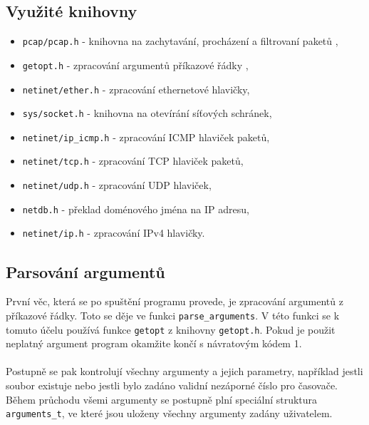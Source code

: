 \documentclass[12pt]{article}
\begin{document}
\subsection*{Využité knihovny}
\begin{itemize}
	\item \texttt{pcap/pcap.h} - knihovna na zachytavání, procházení a filtrovaní paketů \cite{Pcapman}, 
	\item \texttt{getopt.h} - zpracování argumentů příkazové řádky \cite{ARG},
	\item \texttt{netinet/ether.h} - zpracování ethernetové hlavičky, 
	\item \texttt{sys/socket.h} - knihovna na otevírání síťových schránek,
	\item \texttt{netinet/ip\_icmp.h} - zpracování ICMP hlaviček paketů,
	\item \texttt{netinet/tcp.h} - zpracování TCP hlaviček paketů,
	\item \texttt{netinet/udp.h} - zpracování UDP hlaviček,
	\item \texttt{netdb.h} - překlad doménového jména na IP adresu,
	\item \texttt{netinet/ip.h} - zpracování IPv4 hlavičky.
\end{itemize}
\subsection{Parsování argumentů}
První věc, která se po spuštění programu provede, je zpracování argumentů z příkazové řádky. Toto se děje ve funkci \texttt{parse\_arguments}. V této funkci se k tomuto účelu používá funkce 
\texttt{getopt} z knihovny \texttt{getopt.h}. Pokud je použit neplatný argument program okamžite končí s návratovým kódem 1. 
\\\\
Postupně se pak kontrolují všechny argumenty a jejich parametry, například jestli soubor existuje nebo jestli bylo zadáno validní nezáporné číslo pro časovače.
Během průchodu všemi argumenty se postupně plní speciální struktura \texttt{arguments\_t}, ve které jsou uloženy všechny argumenty zadány uživatelem.
\end{document}
